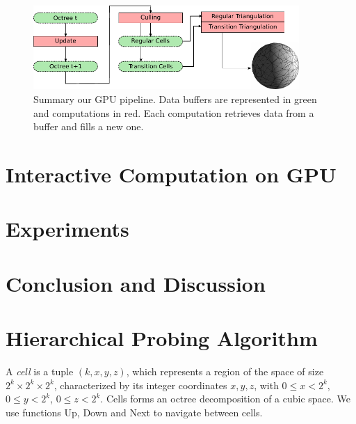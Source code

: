 \documentclass{llncs}
\begin{document}
\begin{figure}[!htbp]
  \centering
  \includegraphics[width=0.9\textwidth]{figs/pipeline}
  \caption{ Summary our GPU pipeline. Data buffers are
    represented in green and computations in red. Each computation
    retrieves data from a buffer and fills a new one. }
  \label{fig_pipeline}
\end{figure}




\section{Interactive Computation on GPU}
\label{sec:inter-visu-gpu}






\section{Experiments}
\label{sec:experiments}



\section{Conclusion and Discussion}
\label{sec:discussion}



\appendix
\section{Hierarchical Probing Algorithm}



A {\em cell} is a tuple $(k,x,y,z)$, which represents a region of the space of size $2^k \times
2^k \times 2^k$, characterized by its integer coordinates $x,y,z$,
with $0 \le x < 2^k$, $0 \le y < 2^k$, $0 \le z < 2^k$. Cells forms an
octree decomposition of a cubic space. We use functions Up, Down and
Next to navigate between cells.
\end{document}
